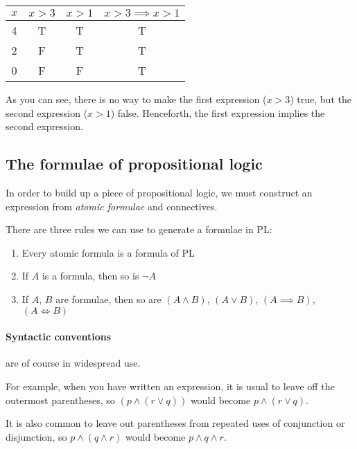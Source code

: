 \begin{center}
	\begin{tabular}{|c|c|c|c|}
		\hline
		$x$ & $x > 3$ & $x > 1$ & $x > 3 \implies x > 1$\\ \hline
		4 & T & T & T\\
		2 & F & T & T\\
		0 & F & F & T\\ \hline
	\end{tabular}
\end{center}

As you can see, there is no way to make the first expression ($x>3$) true, but
the second expression ($x>1$) false. Henceforth, the first expression implies
the second expression.

\subsection{The formulae of propositional logic}

In order to build up a piece of propositional logic, we must construct an
expression from {\it atomic formulae} and connectives.


There are three rules we can use to generate a formulae in PL:

\begin{enumerate}
	\item Every atomic formula is a formula of PL
	\item If $A$ is a formula, then so is $\neg A$
	\item If $A$, $B$ are formulae, then so are $(A \wedge B)$, $(A \vee B)$, $(A \implies B)$, $(A \iff B)$
\end{enumerate}

\paragraph{Syntactic conventions} are of course in widespread use. 

For example, when you have written an expression, it is usual to leave off the
outermost parentheses, so $(p \wedge (r \vee q))$ would become $p \wedge (r \vee
q)$.

It is also common to leave out parentheses from repeated uses of conjunction or
disjunction, so $p \wedge (q \wedge r)$ would become $p \wedge q \wedge r$.

